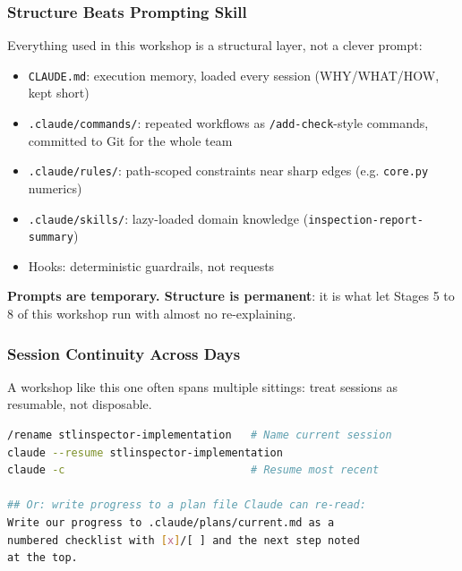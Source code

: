 \begin{frame}[fragile]\frametitle{Structure Beats Prompting Skill}
Everything used in this workshop is a structural layer, not a clever prompt:
  \begin{itemize}
    \item \texttt{CLAUDE.md}: execution memory, loaded every session (WHY/WHAT/HOW, kept short)
    \item \texttt{.claude/commands/}: repeated workflows as \texttt{/add-check}-style commands, committed to Git for the whole team
    \item \texttt{.claude/rules/}: path-scoped constraints near sharp edges (e.g. \texttt{core.py} numerics)
    \item \texttt{.claude/skills/}: lazy-loaded domain knowledge (\texttt{inspection-report-summary})
    \item Hooks: deterministic guardrails, not requests
  \end{itemize}
\textbf{Prompts are temporary. Structure is permanent}: it is what let Stages 5 to 8 of this workshop run with almost no re-explaining.
\end{frame}


\begin{frame}[fragile]\frametitle{Session Continuity Across Days}
A workshop like this one often spans multiple sittings: treat sessions as resumable, not disposable.
\begin{lstlisting}[language=bash]
/rename stlinspector-implementation   # Name current session
claude --resume stlinspector-implementation
claude -c                             # Resume most recent

## Or: write progress to a plan file Claude can re-read:
Write our progress to .claude/plans/current.md as a
numbered checklist with [x]/[ ] and the next step noted
at the top.
\end{lstlisting}
\end{frame}


